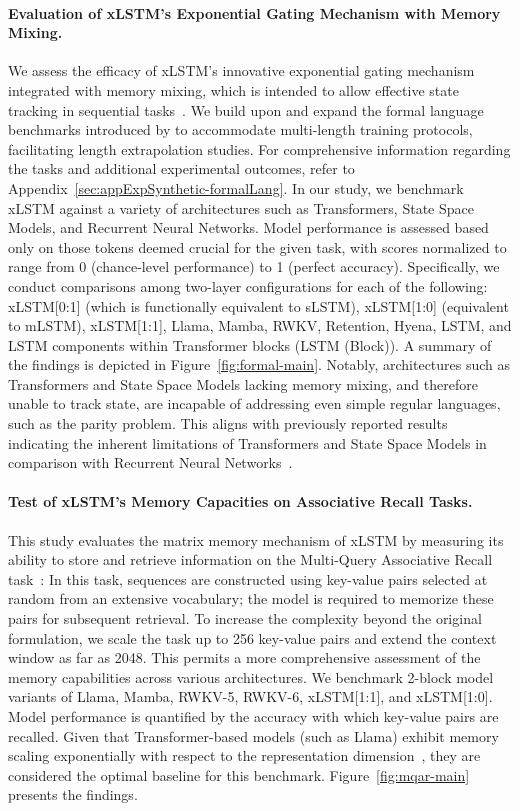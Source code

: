 \paragraph{Evaluation of xLSTM’s Exponential Gating Mechanism with Memory Mixing.} We assess the efficacy of xLSTM’s innovative exponential gating mechanism integrated with memory mixing, which is intended to allow effective state tracking in sequential tasks~\citep{Merrill:24, Merrill:23}. We build upon and expand the formal language benchmarks introduced by \citet{Deletang:23} to accommodate multi-length training protocols, facilitating length extrapolation studies. For comprehensive information regarding the tasks and additional experimental outcomes, refer to Appendix~\ref{sec:appExpSynthetic-formalLang}. In our study, we benchmark xLSTM against a variety of architectures such as Transformers, State Space Models, and Recurrent Neural Networks. Model performance is assessed based only on those tokens deemed crucial for the given task, with scores normalized to range from 0 (chance-level performance) to 1 (perfect accuracy). Specifically, we conduct comparisons among two-layer configurations for each of the following: xLSTM[0:1] (which is functionally equivalent to sLSTM), xLSTM[1:0] (equivalent to mLSTM), xLSTM[1:1], Llama, Mamba, RWKV, Retention, Hyena, LSTM, and LSTM components within Transformer blocks (LSTM (Block)). A summary of the findings is depicted in Figure~\ref{fig:formal-main}. Notably, architectures such as Transformers and State Space Models lacking memory mixing, and therefore unable to track state, are incapable of addressing even simple regular languages, such as the parity problem. This aligns with previously reported results indicating the inherent limitations of Transformers and State Space Models in comparison with Recurrent Neural Networks~\citep{Merrill:24, Merrill:23, Deletang:23}.

\paragraph{Test of xLSTM's Memory Capacities on Associative Recall Tasks.} This study evaluates the matrix memory mechanism of xLSTM by measuring its ability to store and retrieve information on the Multi-Query Associative Recall task~\citep{Arora:23arxiv}: In this task, sequences are constructed using key-value pairs selected at random from an extensive vocabulary; the model is required to memorize these pairs for subsequent retrieval. To increase the complexity beyond the original formulation, we scale the task up to 256 key-value pairs and extend the context window as far as 2048. This permits a more comprehensive assessment of the memory capabilities across various architectures. We benchmark 2-block model variants of Llama, Mamba, RWKV-5, RWKV-6, xLSTM[1:1], and xLSTM[1:0]. Model performance is quantified by the accuracy with which key-value pairs are recalled. Given that Transformer-based models (such as Llama) exhibit memory scaling exponentially with respect to the representation dimension~\citep{Ramsauer:21}, they are considered the optimal baseline for this benchmark. Figure~\ref{fig:mqar-main} presents the findings.

